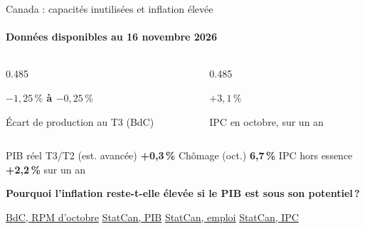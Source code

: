 \documentclass[aspectratio=169]{beamer}
\begin{document}
\begin{frame}[t]{Canada : capacités inutilisées et inflation élevée}
   \framesubtitle{Données disponibles au 16 novembre 2026}
   \small
   \vspace{0.2cm}
   \begin{columns}[T,onlytextwidth]
      \begin{column}{0.485\textwidth}
         \begin{tcolorbox}[s4 snapshot, colback=HECnavy!5, colframe=HECnavy,
            coltitle=HECnavy, colbacktitle=HECnavy!12, title={\strut Activité sous le potentiel}]
            \centering
            {\Large\bfseries\boldmath $-1{,}25\,\%$ à $-0{,}25\,\%$\par}
            \smallskip
            Écart de production au T3 (BdC)\par
         \end{tcolorbox}
      \end{column}
      \begin{column}{0.485\textwidth}
         \begin{tcolorbox}[s4 snapshot, colback=HECcoral!5, colframe=HECcoral,
            coltitle=HECcoral, colbacktitle=HECcoral!12, title={\strut Inflation élevée}]
            \centering
            {\Large\bfseries\boldmath $+3{,}1\,\%$\par}
            \smallskip
            IPC en octobre, sur un an\par
         \end{tcolorbox}
      \end{column}
   \end{columns}
   \vspace{0.28cm}
   {\centering\footnotesize
   PIB réel T3/T2 (est. avancée) \textbf{+0,3\,\%}
   \enspace\textbullet\enspace Chômage (oct.) \textbf{6,7\,\%}
   \enspace\textbullet\enspace IPC hors essence \textbf{+2,2\,\%} sur un an\par}
   \vspace{0.35cm}
   {\centering\bfseries Pourquoi l’inflation reste-t-elle élevée si le PIB est sous son potentiel\,?\par}
   \vspace{0.25cm}
   {\scriptsize\hfill
   \href{https://www.bankofcanada.ca/publications/mpr/mpr-2026-10-28/canadian-conditions/}{BdC, RPM d’octobre}
   \quad\href{https://www150.statcan.gc.ca/n1/daily-quotidien/261030/dq261030a-eng.htm}{StatCan, PIB}
   \quad\href{https://www150.statcan.gc.ca/n1/daily-quotidien/261106/dq261106a-eng.htm}{StatCan, emploi}
   \quad\href{https://www150.statcan.gc.ca/n1/daily-quotidien/261116/t001a-eng.htm}{StatCan, IPC}}
\end{frame}
\end{document}
